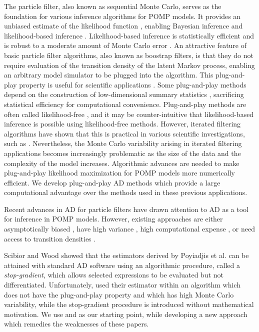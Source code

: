 \documentclass[11pt]{article}
\begin{document}
The particle filter, also known as sequential Monte Carlo, serves as the foundation for various inference algorithms for POMP models.
It provides an unbiased estimate of the likelihood function  \cite{delMoral04}, enabling Bayesian inference \cite{andrieu10,chopin13} and likelihood-based inference \cite{ionides06-pnas,ionides15}.
Likelihood-based inference is statistically efficient \cite{pawitan01} and is robust to a moderate amount of Monte Carlo error \cite{ionides17,ning21}.
An attractive feature of basic particle filter algorithms, also known as boostrap filters, is that they do not require evaluation of the transition density of the latent Markov process, enabling an arbitrary model simulator to be plugged into the algorithm.
This plug-and-play property is useful for scientific applications \cite{he10}.
Some plug-and-play methods depend on the construction of low-dimensional summary statistics \cite{wood10,toni09}, sacrificing statistical efficiency for computational convenience.
Plug-and-play methods are often called likelihood-free \cite{owen15}, and it may be counter-intuitive that likelihood-based inference is possible using likelihood-free methods. 
However, iterated filtering algorithms have shown that this is practical in various scientific investigations, such as \cite{king08,blake14,pons-salort18,subramanian21,fox22,drake23}.
Nevertheless, the Monte Carlo variability arising in iterated filtering applications becomes increasingly problematic as the size of the data and the complexity of the model increases.
Algorithmic advances are needed to make plug-and-play likelihood maximization for POMP models more numerically efficient.
We develop plug-and-play AD methods which provide a large computational advantage over the methods used in these previous applications.

Recent advances in AD for particle filters \cite{naesseth18, jonschkowski18, corenflos21, scibior21, singh22} have drawn attention to AD as a tool for inference in POMP models.
However, existing approaches are either asymptotically biased \cite{naesseth18, jonschkowski18}, have high variance \cite{poyiadjis11, scibior21}, high computational expense \cite{corenflos21, chen24}, or need access to transition densities \cite{poyiadjis11, scibior21, singh22, chen24}.

Scibior and Wood \cite{scibior21} showed that the estimators derived by Poyiadjis et al. \cite{poyiadjis11} can be attained with standard AD software using an algorithmic procedure, called a {\it stop-gradient}, which allows selected expressions to be evaluated but not differentiated.
Unfortunately, \cite{scibior21} used their estimator within an algorithm which does not have the plug-and-play property and which has high Monte Carlo variability, while the stop-gradient procedure is introduced without mathematical motivation.
We use \cite{scibior21} and \cite{poyiadjis11} as our starting point, while developing a new approach which remedies the weaknesses of these papers.
\end{document}
